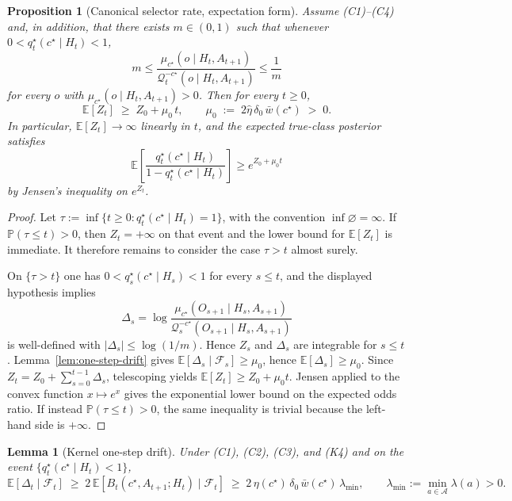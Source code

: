 \documentclass[11pt]{article}
\newtheorem{proposition}[theorem]{Proposition}
\newtheorem{lemma}[theorem]{Lemma}
\theoremstyle{definition}
\theoremstyle{remark}
\newcommand{\Acal}{\mathcal{A}}
\newcommand{\Qcal}{\mathcal{Q}}
\newcommand{\E}{\mathbb{E}}
\newcommand{\Prob}{\mathbb{P}}
\begin{document}
\begin{proposition}[Canonical selector rate, expectation form]
\label{prop:exp-rate}
Assume \textup{(C1)--(C4)} and, in addition, that there exists $m\in(0,1)$ such that whenever $0<q_t^\star(c^\star\mid H_t)<1$,
\[
m\le
\frac{\mu_{c^\star}(o\mid H_t,A_{t+1})}{\Qcal_t^{-c^\star}(o\mid H_t,A_{t+1})}
\le \frac{1}{m}
\]
for every $o$ with $\mu_{c^\star}(o\mid H_t,A_{t+1})>0$. Then for every $t\ge 0$,
\[
\E[Z_t]\;\ge\;Z_0+\mu_0\,t,
\qquad
\mu_0\;:=\;2\hat\eta\,\delta_0\,\bar w(c^\star)\;>\;0.
\]
In particular, $\E[Z_t]\to\infty$ linearly in $t$, and the expected true-class posterior satisfies
\[
\E\!\left[\frac{q_t^\star(c^\star\mid H_t)}{1-q_t^\star(c^\star\mid H_t)}\right]\ge e^{Z_0+\mu_0 t}
\]
by Jensen's inequality on $e^{Z_t}$.
\end{proposition}

\begin{proof}
Let $\tau:=\inf\{t\ge 0:q_t^\star(c^\star\mid H_t)=1\}$, with the convention $\inf\varnothing=\infty$. If $\Prob(\tau\le t)>0$, then $Z_t=+\infty$ on that event and the lower bound for $\E[Z_t]$ is immediate. It therefore remains to consider the case $\tau>t$ almost surely.

On $\{\tau>t\}$ one has $0<q_s^\star(c^\star\mid H_s)<1$ for every $s\le t$, and the displayed hypothesis implies
\[
\Delta_s=\log\frac{\mu_{c^\star}(O_{s+1}\mid H_s,A_{s+1})}{\Qcal_s^{-c^\star}(O_{s+1}\mid H_s,A_{s+1})}
\]
is well-defined with $|\Delta_s|\le \log(1/m)$. Hence $Z_s$ and $\Delta_s$ are integrable for $s\le t$. Lemma~\ref{lem:one-step-drift} gives $\E[\Delta_s\mid\mathcal F_s]\ge\mu_0$, hence $\E[\Delta_s]\ge\mu_0$. Since $Z_t=Z_0+\sum_{s=0}^{t-1}\Delta_s$, telescoping yields $\E[Z_t]\ge Z_0+\mu_0 t$. Jensen applied to the convex function $x\mapsto e^x$ gives the exponential lower bound on the expected odds ratio. If instead $\Prob(\tau\le t)>0$, the same inequality is trivial because the left-hand side is $+\infty$.
\end{proof}

\begin{lemma}[Kernel one-step drift]
\label{lem:one-step-drift-kernel}
Under \textup{(C1)}, \textup{(C2)}, \textup{(C3)}, and \textup{(K4)} and on the event $\{q_t^\star(c^\star\mid H_t)<1\}$,
\[
\E[\Delta_t\mid\mathcal F_t]
\;\ge\;
2\,\E[B_t(c^\star,A_{t+1};H_t)\mid\mathcal F_t]
\;\ge\;
2\,\eta(c^\star)\,\delta_0\,\bar w(c^\star)\,\lambda_{\min},
\qquad
\lambda_{\min}:=\min_{a\in\Acal}\lambda(a)>0.
\]
\end{lemma}
\end{document}
